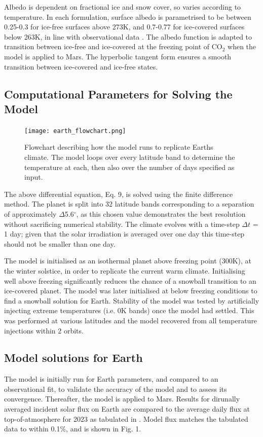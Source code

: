 \documentclass[12pt,onecolumn]{revtex4-2}    %
\begin{document}
Albedo is dependent on fractional ice and snow cover, so varies according to temperature. In each formulation, surface albedo is parametrised to be between 0.25-0.3 for ice-free surfaces above 273K, and 0.7-0.77 for ice-covered surfaces below 263K, in line with observational data \cite{GQ01} \cite{PP12}. The albedo function is adapted to transition between ice-free and ice-covered at the freezing point of $\mathrm{CO_2}$ when the model is applied to Mars. The hyperbolic tangent form ensures a smooth transition between ice-covered and ice-free states.

\subsection{Computational Parameters for Solving the Model}

\begin{figure}[H]
\centering
\texttt{[image: earth\_flowchart.png]}
\caption{Flowchart describing how the model runs to replicate Earths climate. The model loops over every latitude band to determine the temperature at each, then also over the number of days specified as input.}
\label{fig:test}
\end{figure}

The above differential equation, Eq. 9, is solved using the finite difference method. The planet is split into 32 latitude bands corresponding to a separation of approximately $\Delta$5.6$^{\circ}$, as this chosen value demonstrates the best resolution without sacrificing numerical stability. The climate evolves with a time-step $\Delta t$ = 1 day; given that the solar irradiation is averaged over one day this time-step should not be smaller than one day.
\

The model is initialised as an isothermal planet above freezing point (300K), at the winter solstice, in order to replicate the current warm climate. Initialising well above freezing significantly reduces the chance of a snowball transition to an ice-covered planet. The model was later initialised at below freezing conditions to find a snowball solution for Earth. Stability of the model was tested by artificially injecting extreme temperatures (i.e. 0K bands) once the model had settled. This was performed at various latitudes and the model recovered from all temperature injections within 2 orbits. %


\subsection{Model solutions for Earth}
The model is initially run for Earth parameters, and compared to an observational fit, to validate the accuracy of the model and to assess its convergence. Thereafter, the model is applied to Mars. Results for dirunally averaged incident solar flux on Earth are compared to the average daily flux at top-of-atmosphere for 2023 as tabulated in \cite{K23}. Model flux matches the tabulated data to within 0.1\%, and is shown in Fig. 1.
\end{document}
